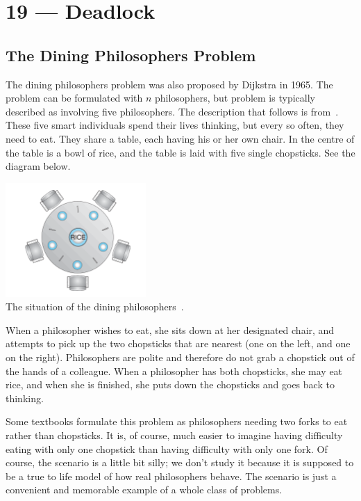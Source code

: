 \documentclass[a4paper]{report}
\begin{document}
\chapter*{19 --- Deadlock}


\section*{The Dining Philosophers Problem}

The dining philosophers problem was also proposed by Dijkstra in 1965. The problem can be formulated with $n$ philosophers, but problem is typically described as involving five philosophers. The description that follows is from~\cite{osc}. These five smart individuals spend their lives thinking, but every so often, they need to eat. They share a table, each having his or her own chair. In the centre of the table is a bowl of rice, and the table is laid with five single chopsticks. See the diagram below.

\begin{center}
	\includegraphics[width=0.4\textwidth]{images/philosopher-table.png}\\
	The situation of the dining philosophers~\cite{osc}.
\end{center}

When a philosopher wishes to eat, she sits down at her designated chair, and attempts to pick up the two chopsticks that are nearest (one on the left, and one on the right). Philosophers are polite and therefore do not grab a chopstick out of the hands of a colleague. When a philosopher has both chopsticks, she may eat rice, and when she is finished, she puts down the chopsticks and goes back to thinking.

Some textbooks formulate this problem as philosophers needing two forks to eat rather than chopsticks. It is, of course, much easier to imagine having difficulty eating with only one chopstick than having difficulty with only one fork. Of course, the scenario is a little bit silly; we don't study it because it is supposed to be a true to life model of how real philosophers behave. The scenario is just a convenient and memorable example of a whole class of problems.
\end{document}
